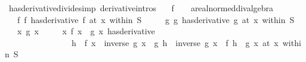 \begin{isabellebody}
%
\endisatagproof
{\isafoldproof}%
%
\isadelimproof
\isanewline
%
\endisadelimproof
\isanewline
{}\isamarkupfalse%
\ has{\isacharunderscore}{\kern0pt}derivative{\isacharunderscore}{\kern0pt}divide{\isacharbrackleft}{\kern0pt}simp{\isacharcomma}{\kern0pt}\ derivative{\isacharunderscore}{\kern0pt}intros{\isacharbrackright}{\kern0pt}{\isacharcolon}{\kern0pt}\isanewline
\ \ \ f\ {\isacharcolon}{\kern0pt}{\isacharcolon}{\kern0pt}\ {\isachardoublequoteopen}{\isacharunderscore}{\kern0pt}\ {\isasymRightarrow}\ {\isacharprime}{\kern0pt}a{\isacharcolon}{\kern0pt}{\isacharcolon}{\kern0pt}real{\isacharunderscore}{\kern0pt}normed{\isacharunderscore}{\kern0pt}div{\isacharunderscore}{\kern0pt}algebra{\isachardoublequoteclose}\isanewline
\ \ \ f{\isacharcolon}{\kern0pt}\ {\isachardoublequoteopen}{\isacharparenleft}{\kern0pt}f\ has{\isacharunderscore}{\kern0pt}derivative\ f{\isacharprime}{\kern0pt}{\isacharparenright}{\kern0pt}\ {\isacharparenleft}{\kern0pt}at\ x\ within\ S{\isacharparenright}{\kern0pt}{\isachardoublequoteclose}\isanewline
\ \ \ \ \ g{\isacharcolon}{\kern0pt}\ {\isachardoublequoteopen}{\isacharparenleft}{\kern0pt}g\ has{\isacharunderscore}{\kern0pt}derivative\ g{\isacharprime}{\kern0pt}{\isacharparenright}{\kern0pt}\ {\isacharparenleft}{\kern0pt}at\ x\ within\ S{\isacharparenright}{\kern0pt}{\isachardoublequoteclose}\isanewline
\ \ \ x{\isacharcolon}{\kern0pt}\ {\isachardoublequoteopen}g\ x\ {\isasymnoteq}\ {}{\isachardoublequoteclose}\isanewline
\ \ \ {\isachardoublequoteopen}{\isacharparenleft}{\kern0pt}{\isacharparenleft}{\kern0pt}{\isasymlambda}x{\isachardot}{\kern0pt}\ f\ x\ {\isacharslash}{\kern0pt}\ g\ x{\isacharparenright}{\kern0pt}\ has{\isacharunderscore}{\kern0pt}derivative\isanewline
\ \ \ \ \ \ \ \ \ \ \ \ \ \ \ \ {\isacharparenleft}{\kern0pt}{\isasymlambda}h{\isachardot}{\kern0pt}\ {\isacharminus}{\kern0pt}\ f\ x\ {\isacharasterisk}{\kern0pt}\ {\isacharparenleft}{\kern0pt}inverse\ {\isacharparenleft}{\kern0pt}g\ x{\isacharparenright}{\kern0pt}\ {\isacharasterisk}{\kern0pt}\ g{\isacharprime}{\kern0pt}\ h\ {\isacharasterisk}{\kern0pt}\ inverse\ {\isacharparenleft}{\kern0pt}g\ x{\isacharparenright}{\kern0pt}{\isacharparenright}{\kern0pt}\ {\isacharplus}{\kern0pt}\ f{\isacharprime}{\kern0pt}\ h\ {\isacharslash}{\kern0pt}\ g\ x{\isacharparenright}{\kern0pt}{\isacharparenright}{\kern0pt}\ {\isacharparenleft}{\kern0pt}at\ x\ within\ S{\isacharparenright}{\kern0pt}{\isachardoublequoteclose}\isanewline
%
\isadelimproof
\ \ %
\endisadelimproof

\end{isabellebody}
